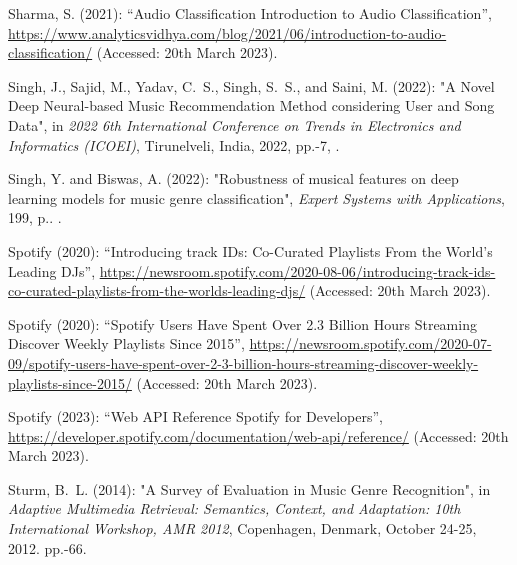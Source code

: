 \documentclass[11pt,titlepage,oneside]{book}
\begin{document}
\begin{thebibliography}{97}
	Sharma, S. (2021): \enquote{Audio {Classification} {\textbar} {Introduction} to
		{Audio} {Classification}},
	\urlprefix\url{https://www.analyticsvidhya.com/blog/2021/06/introduction-to-audio-classification/} (Accessed: 20th March 2023).
	
	Singh, J., Sajid, M., Yadav, C.~S., Singh, S.~S., and Saini, M. (2022):
	"A {Novel} {Deep} {Neural}-based {Music} {Recommendation} {Method}
		considering {User} and {Song} {Data}", in \textit{2022 6th {International}
		{Conference} on {Trends} in {Electronics} and {Informatics} ({ICOEI})}, Tirunelveli, India, 2022, pp.-7, .
	
	Singh, Y. and Biswas, A. (2022): "Robustness of musical features on
		deep learning models for music genre classification", \textit{Expert Systems
		with Applications}, 199, p..
	.
	
	Spotify (2020{}): \enquote{Introducing track {IDs}: {Co}-{Curated}
		{Playlists} {From} the {World}’s {Leading} {DJs}},
	\urlprefix\url{https://newsroom.spotify.com/2020-08-06/introducing-track-ids-co-curated-playlists-from-the-worlds-leading-djs/} (Accessed: 20th March 2023).
	
	Spotify (2020{}): \enquote{Spotify {Users} {Have} {Spent} {Over}
		2.3 {Billion} {Hours} {Streaming} {Discover} {Weekly} {Playlists} {Since}
		2015},
	\urlprefix\url{https://newsroom.spotify.com/2020-07-09/spotify-users-have-spent-over-2-3-billion-hours-streaming-discover-weekly-playlists-since-2015/} (Accessed: 20th March 2023).
	
	Spotify (2023): \enquote{Web {API} {Reference} {\textbar} {Spotify} for
		{Developers}},
	\urlprefix\url{https://developer.spotify.com/documentation/web-api/reference/} (Accessed: 20th March 2023).
	
	Sturm, B.~L. (2014): "A {Survey} of {Evaluation} in {Music} {Genre}
		{Recognition}", in \textit{Adaptive Multimedia Retrieval: Semantics, Context, and Adaptation: 10th International Workshop, AMR 2012}, Copenhagen, Denmark, October 24-25, 2012.
	pp.-66. 
	

\end{thebibliography}
\end{document}
